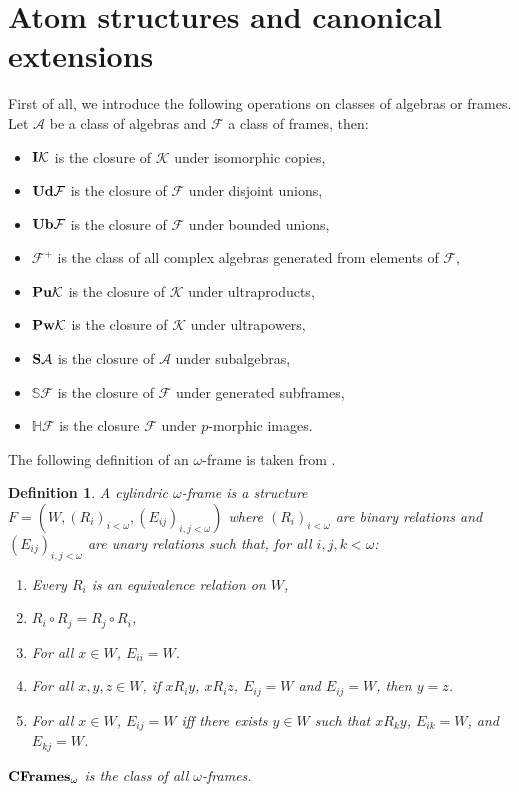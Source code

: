 \documentclass{article}
\theoremstyle{defin}
\newtheorem{definition}{Definition}
\theoremstyle{theorem}
\theoremstyle{claim}
\theoremstyle{prop}
\theoremstyle{lemma}
\theoremstyle{fact}
\theoremstyle{remark}
\theoremstyle{ex}
\theoremstyle{col}
\theoremstyle{question}
\begin{document}
\section{Atom structures and canonical extensions}

First of all, we introduce the following operations on classes of algebras or frames. Let $\mathcal{A}$ be a class of algebras and $\mathcal{F}$ a class of frames, then:
\begin{itemize}
\item ${\bf I} \mathcal{K}$ is the closure of $\mathcal{K}$ under isomorphic copies,
\item ${\bf Ud} \mathcal{F}$ is the closure of $\mathcal{F}$ under disjoint unions,
\item ${\bf Ub} \mathcal{F}$ is the closure of $\mathcal{F}$ under bounded unions,
\item $\mathcal{F}^+$ is the class of all complex algebras generated from elements of $\mathcal{F}$,
\item ${\bf Pu} \mathcal{K}$ is the closure of $\mathcal{K}$ under ultraproducts,
\item ${\bf Pw} \mathcal{K}$ is the closure of $\mathcal{K}$ under ultrapowers,
\item ${\bf S} \mathcal{A}$ is the closure of $\mathcal{A}$ under subalgebras,
\item $\mathbb{S} \mathcal{F}$ is the closure of $\mathcal{F}$ under generated subframes,
\item $\mathbb{H} \mathcal{F}$ is the closure $\mathcal{F}$ under $p$-morphic images.
\end{itemize}

The following definition of an $\omega$-frame is taken from \cite{Venema2013}.
\begin{definition}
  A cylindric $\omega$-frame is a structure $F = (W, (R_i)_{i < \omega}, (E_{ij})_{i, j < \omega})$ where $(R_i)_{i < \omega}$ are binary relations and $(E_{ij})_{i, j < \omega}$ are unary relations such that, for all $i, j, k < \omega$:
  \begin{enumerate}
  \item Every $R_i$ is an equivalence relation on $W$,
  \item $R_i \circ R_j = R_j \circ R_i$,
  \item For all $x \in W$, $E_{ii} = W$.
  \item For all $x, y, z \in W$, if $x R_i y$, $x R_i z$, $E_{ij} = W$ and $E_{ij} = W$, then $y = z$.
  \item For all $x \in W$, $E_{ij} = W$ iff there exists $y \in W$ such that $x R_k y$, $E_{ik} = W$, and $E_{kj} = W$.
\begin{comment}
  \item For all $x, z \in W$, if $E_{ij} = W$ and there exists $y \in W$ such that $z \neq y$, $x R_i y$, $x R_j z$, then there exists $u \in W$ such that $E_{ij} = \emptyset$, $x R_j u$ and $u R_i z$.
\end{comment}
  \end{enumerate}
  ${\bf CFrames}_{\omega}$ is the class of all $\omega$-frames.
\end{definition}
\end{document}

